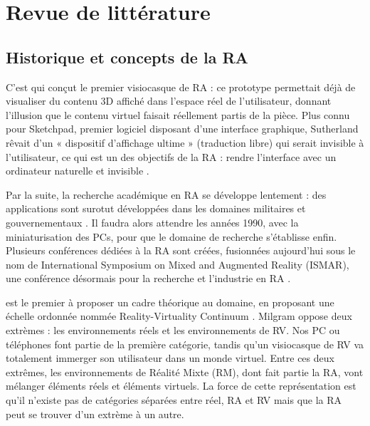\chapter{Revue de littérature}
\label{ch:litterature}

\section{Historique et concepts de la RA}
C'est \cite{Sutherland1968} qui conçut le premier visiocasque de RA  : ce prototype permettait déjà de visualiser du contenu 3D affiché dans l'espace réel de l'utilisateur, donnant l'illusion que le contenu virtuel faisait réellement partis de la pièce. Plus connu pour Sketchpad, premier logiciel disposant d'une interface graphique, Sutherland rêvait d'un « dispositif d'affichage ultime » (traduction libre) qui serait invisible à l'utilisateur, ce qui est un des objectifs de la RA : rendre l'interface avec un ordinateur naturelle et invisible \citep{Billinghurst2015}.


Par la suite, la recherche académique en RA se développe lentement : des applications sont surotut développées dans les domaines militaires et gouvernementaux \citep{VanKrevelen2010}. Il faudra alors attendre les années 1990, avec la miniaturisation des PCs, pour que le domaine de recherche s'établisse enfin. Plusieurs conférences dédiées à la RA sont créées, fusionnées aujourd'hui sous le nom de International Symposium on Mixed and Augmented Reality (ISMAR), une conférence désormais pour la recherche et l'industrie en RA \citep{Azuma2001}.

\cite{Milgram1994} est le premier à proposer un cadre théorique au domaine, en proposant une échelle ordonnée nommée \foreignlanguage{english}{Reality-Virtuality Continuum} . Milgram oppose deux extrèmes : les environnements réels et les environnements de RV. Nos PC ou téléphones font partie de la première catégorie, tandis qu'un visiocasque de RV va totalement immerger son utilisateur dans un monde virtuel. Entre ces deux extrêmes, les environnements de Réalité Mixte (RM), dont fait partie la RA, vont mélanger éléments réels et éléments virtuels. La force de cette représentation est qu'il n'existe pas de catégories séparées entre réel, RA et RV mais que la RA peut se trouver d'un extrème à un autre.

